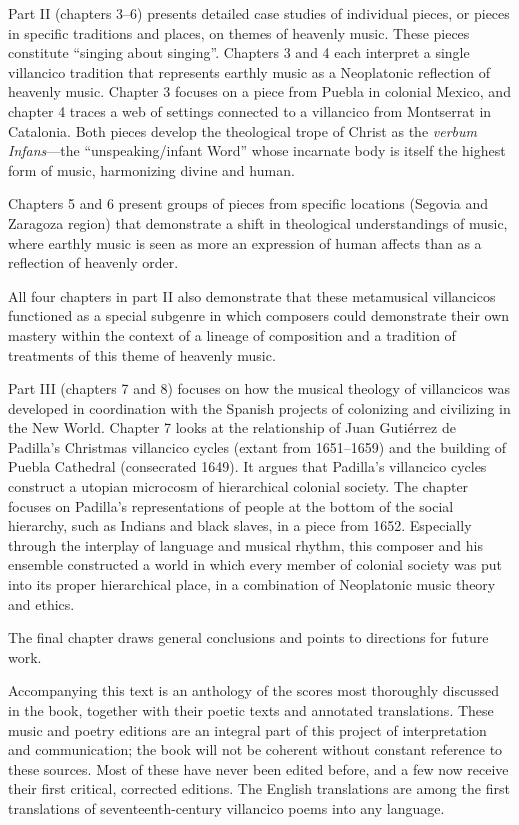 \documentclass[oneside,12pt]{book}
\begin{document}
      Part II (chapters 3--6) presents detailed case studies of individual pieces, or pieces in specific traditions and places, on themes of heavenly music.
      These pieces constitute \enquote{singing about singing}.
      Chapters 3 and 4 each interpret a single villancico tradition that represents earthly music as a Neoplatonic reflection of heavenly music.
      Chapter 3 focuses on a piece from Puebla in colonial Mexico, and chapter 4 traces a web of settings connected to a villancico from Montserrat in Catalonia.
      Both pieces develop the theological trope of Christ as the \emph{verbum Infans}—the \enquote{unspeaking/infant Word} whose incarnate body is itself the highest form of music, harmonizing divine and human.
    
      Chapters 5 and 6 present groups of pieces from specific locations (Segovia and Zaragoza region) that demonstrate a shift in theological understandings of music, where earthly music is seen as more an expression of human affects than as a reflection of heavenly order.
      
      All four chapters in part II also demonstrate that these metamusical villancicos functioned as a special subgenre in which composers could demonstrate their own mastery within the context of a lineage of composition and a tradition of treatments of this theme of heavenly music.
    
      Part III (chapters 7 and 8) focuses on how the musical theology of villancicos was developed in coordination with the Spanish projects of colonizing and civilizing in the New World.
      Chapter 7 looks at the relationship of Juan Gutiérrez de Padilla’s Christmas villancico cycles (extant from 1651--1659) and the building of Puebla Cathedral (consecrated 1649).
      It argues that Padilla’s villancico cycles construct a utopian microcosm of hierarchical colonial society.
      The chapter focuses on Padilla’s representations of people at the bottom of the social hierarchy, such as Indians and black slaves, in a piece from 1652.
      Especially through the interplay of language and musical rhythm, this composer and his ensemble constructed a world in which every member of colonial society was put into its proper hierarchical place, in a combination of Neoplatonic music theory and ethics.
      
      The final chapter draws general conclusions and points to directions for future work.
    
      Accompanying this text is an anthology of the scores most thoroughly discussed in the book, together with their poetic texts and annotated translations.
      These music and poetry editions are an integral part of this project of interpretation and communication; the book will not be coherent without constant reference to these sources.
      Most of these have never been edited before, and a few now receive their first critical, corrected editions.
      The English translations are among the first translations of seventeenth-century villancico poems into any language.
    
\end{document}
